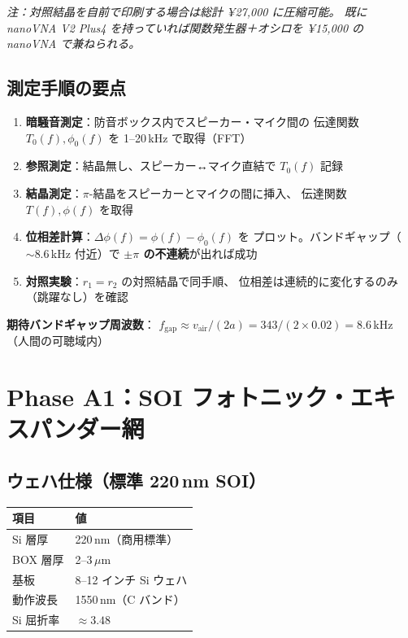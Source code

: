 \documentclass[11pt,a4paper]{article}
\begin{document}
\textit{注：対照結晶を自前で印刷する場合は総計 ¥27,000 に圧縮可能。
既に nanoVNA V2 Plus4 を持っていれば関数発生器＋オシロを
¥15,000 の nanoVNA で兼ねられる。}

\subsection{測定手順の要点}

\begin{enumerate}[leftmargin=2em]
  \item \textbf{暗騒音測定}：防音ボックス内でスピーカー・マイク間の
        伝達関数 $T_0(f), \phi_0(f)$ を 1--20\,kHz で取得（FFT）
  \item \textbf{参照測定}：結晶無し、スピーカー↔マイク直結で $T_0(f)$ 記録
  \item \textbf{結晶測定}：$\pi$-結晶をスピーカーとマイクの間に挿入、
        伝達関数 $T(f), \phi(f)$ を取得
  \item \textbf{位相差計算}：$\Delta\phi(f) = \phi(f) - \phi_0(f)$ を
        プロット。バンドギャップ（$\sim 8.6$\,kHz 付近）で
        \textbf{$\pm\pi$ の不連続}が出れば成功
  \item \textbf{対照実験}：$r_1 = r_2$ の対照結晶で同手順、
        位相差は連続的に変化するのみ（跳躍なし）を確認
\end{enumerate}

\textbf{期待バンドギャップ周波数}：
$f_{\mathrm{gap}} \approx v_{\mathrm{air}}/(2a) = 343/(2\times 0.02) = 8.6$\,kHz
（人間の可聴域内）

\section{Phase A1：SOI フォトニック・エキスパンダー網}
\label{sec:phase_a1}

\subsection{ウェハ仕様（標準 220\,nm SOI）}

\begin{center}
\begin{tabular}{ll}
\toprule
項目 & 値 \\
\midrule
Si 層厚 & 220\,nm（商用標準） \\
BOX 層厚 & 2--3\,$\mu$m \\
基板 & 8--12 インチ Si ウェハ \\
動作波長 & 1550\,nm（C バンド） \\
Si 屈折率 & $\approx 3.48$ \\
\bottomrule
\end{tabular}
\end{center}
\end{document}
